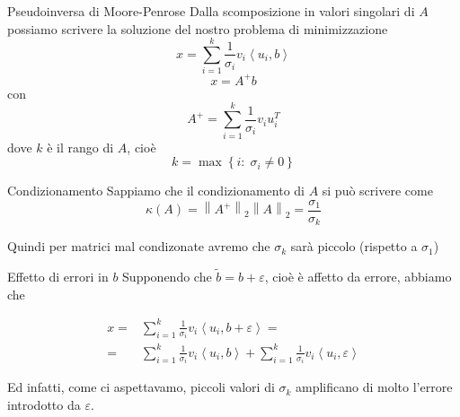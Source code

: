 \documentclass{beamer}
\theoremstyle{plain}
\theoremstyle{definition}
\theoremstyle{remark}
\newcommand{\set}[1]{\left\{#1\right\}}
\newcommand{\ang}[1]{\left<#1\right>}
\newcommand{\norm}[1]{\left\|#1\right\|}
\begin{document}
\begin{frame}{Pseudoinversa di Moore-Penrose}
  Dalla scomposizione in valori singolari di $A$ possiamo scrivere la
  soluzione del nostro problema di minimizzazione
  \[ x = \sum _{i=1} ^k \frac{1}{\sigma _i} v_i \ang{u_i,b} \]
  \[ x = A^+ b \]
  con
  \[ A^+ = \sum _{i=1} ^k \frac{1}{\sigma _i} v_i u_i ^T\]
  dove $k$ è il rango di $A$, cioè
  \[ k = \max \set{ i :\; \sigma_i \neq 0 } \]
\end{frame}

\begin{frame}{Condizionamento}
  Sappiamo che il condizionamento di $A$ si può scrivere come
  \[ \kappa (A) = \norm{A^+}_2\norm{A}_2 = \frac{\sigma _1}{\sigma
    _k} \]

  Quindi per matrici mal condizonate avremo che $\sigma _k$ sarà
  piccolo (rispetto a $\sigma_1$)
\end{frame}

\begin{frame}{Effetto di errori in $b$}
  Supponendo che $\tilde b = b+ \varepsilon$, cioè è affetto da
  errore, abbiamo che 
  
  \begin{align*}
    x =& \sum _{i=1} ^k \frac{1}{\sigma _i} v_i \ang{u_i,b +
      \varepsilon} = \\
    =& \sum _{i=1} ^k \frac{1}{\sigma _i} v_i \ang{u_i,b} + \sum
    _{i=1} ^k \frac{1}{\sigma _i} v_i \ang{u_i,\varepsilon}
  \end{align*}

  Ed infatti, come ci aspettavamo, piccoli valori di $\sigma_k$
  amplificano di molto l'errore introdotto da $\varepsilon$.
\end{frame}
\end{document}
